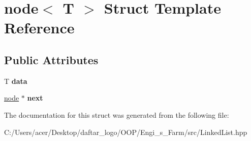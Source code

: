 \hypertarget{structnode}{}\section{node$<$ T $>$ Struct Template Reference}
\label{structnode}
\subsection*{Public Attributes}
\begin{DoxyCompactItemize}
\item 
\mbox{\label{structnode_a0a3e961e5caf1562f0c27caef3940e7a}} 
T {\bfseries data}
\item 
\mbox{\label{structnode_a7c8adb6c07d7574a94a1247285df4c29}} 
\mbox{\hyperlink{structnode}{node}} $\ast$ {\bfseries next}
\end{DoxyCompactItemize}


The documentation for this struct was generated from the following file\+:\begin{DoxyCompactItemize}
\item 
C\+:/\+Users/acer/\+Desktop/daftar\+\_\+logo/\+O\+O\+P/\+Engi\+\_\+s\+\_\+\+Farm/src/Linked\+List.\+hpp\end{DoxyCompactItemize}
